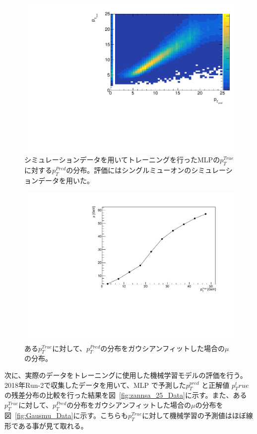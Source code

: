 \begin{figure}[tb]
  \centering
  \includegraphics[clip, width=12cm]{fig/4/zansa_25_MC.pdf}
  \caption{シミュレーションデータを用いてトレーニングを行ったMLPの$p_{T}^{True}$に対する$p_{T}^{Pred}$の分布。評価にはシングルミューオンのシミュレーションデータを用いた。}
  \label{fig:zannsa_25_MC}
\end{figure}

\begin{figure}[tb]
  \centering
  \includegraphics[clip, width=12cm]{fig/4/tp_Gausmean_MC.pdf}
  \caption{ある$p_T^{True}$に対して、$p_T^{Pred}$の分布をガウシアンフィットした場合の$\mu$の分布。}
  \label{fig:Gausmu_MC}
\end{figure}

次に、実際のデータをトレーニングに使用した機械学習モデルの評価を行う。
2018年Run-2で収集したデータを用いて、MLP で予測した$p_{T}^{pred}$ と正解値 $p_{T}^true$ の残差分布の比較を行った結果を図~\ref{fig:zannsa_25_Data}に示す。また、ある$p_T^{True}$に対して、$p_T^{Pred}$の分布をガウシアンフィットした場合の$\mu$の分布を図~\ref{fig:Gausmu_Data}に示す。こちらも$p_T^{True}$に対して機械学習の予測値はほぼ線形である事が見て取れる。

